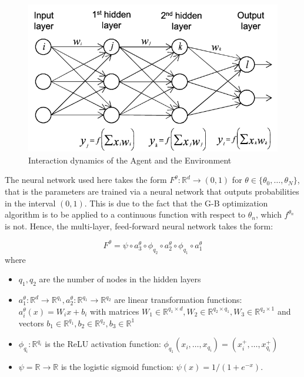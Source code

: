 \documentclass{article}
\begin{document}
\begin{figure}[H] 
	\centering
	\includegraphics[scale=0.4]{feed-forward_NN.png}
	\caption{Interaction dynamics of the Agent and the Environment}
	\label{fig:diagram}
\end{figure}

The neural network used here takes the form $F^{\theta}: \mathbb{R}^d → (0,1)$ for $\theta \in \{\theta_0, \ldots, \theta_N  \}$, that is the parameters are trained via a neural network that outputs probabilities in the interval $(0,1)$. This is due to the fact that the G-B optimization algorithm is to be applied to a continuous function with respect to $\theta_n$, which $f^{\theta_n}$ is not. Hence, the multi-layer, feed-forward neural network takes the form:

\begin{equation}
F^{\theta}= \psi \circ a_3^{\theta} \circ \phi_{q_2} \circ a_2^{\theta} \circ \phi_{q_1} \circ a_1^{\theta}
\end{equation}
where 
\begin{itemize}
    \item $q_1, q_2$ are the number of nodes in the hidden layers
    \item $a_1^{\theta} : \mathbb{R}^d \rightarrow \mathbb{R}^{q_1}, a_2^{\theta}: \mathbb{R}^{q_1} \rightarrow \mathbb{R}^{q_2}$ are linear transformation functions: $a_i^{\theta}(x)=W_i x + b_i$ with matrices $W_1 \in \mathbb{R}^{q_1 \times d}, W_2 \in \mathbb{R}^{q_2 \times q_1}, W_3 \in \mathbb{R}^{q_2 \times 1}$ and vectors $b_1 \in \mathbb{R}^{q_1}, b_2 \in \mathbb{R}^{q_2}, b_3 \in \mathbb{R}^{1}$
    \item $\phi_{q_i}: \mathbb{R}^{q_i}$ is the ReLU activation function: $\phi_{q_1}(x_i, \ldots, x_{q_i})=(x_i^{+}, \ldots, x_{q_i}^{+})$
    \item $\psi = \mathbb{R} \rightarrow \mathbb{R}$ is the logistic sigmoid function: $\psi(x)=1/(1+ e^{-x})$.
\end{itemize}
\end{document}
